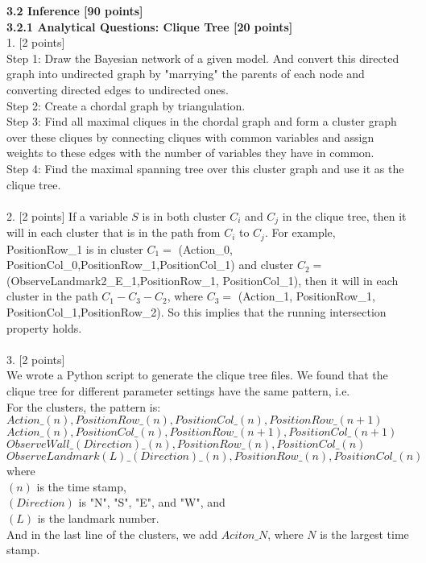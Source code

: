 \documentclass[a4paper]{article}
\begin{document}
\noindent \Large \textbf{3.2 Inference [90 points]}\\
\large \textbf{3.2.1 Analytical Questions: Clique Tree [20 points]}\\
1. [2 points]\\
Step 1: 
Draw the Bayesian network of a given model. And convert this directed graph into undirected graph by "marrying" the parents of each node and converting directed edges to undirected ones.\\
Step 2: 
Create a chordal graph by triangulation.\\
Step 3:
Find all maximal cliques in the chordal graph and form a cluster graph over these cliques by connecting cliques with common variables and assign weights  to these edges with the number of variables they have in common.\\
Step 4:
Find the maximal spanning tree over this cluster graph and use it as the clique tree.\\
\\
2. [2 points]
If a variable $S$ is in both cluster $C_i$ and $C_j$ in the clique tree, then it will in each cluster that is in the path from $C_i$ to $C_j$. For example, 
PositionRow\_1 is in cluster $C_1=$ (Action\_0, PositionCol\_0,PositionRow\_1,PositionCol\_1) and cluster $C_2=$ (ObserveLandmark2\_E\_1,PositionRow\_1, PositionCol\_1), then it will in each cluster in the path $C_1-C_3-C_2$, where $C_3=$ (Action\_1, PositionRow\_1, PositionCol\_1,PositionRow\_2). So this implies that the running intersection property holds.\\
\\
3. [2 points]
\\
We wrote a Python script to generate the clique tree files. We found that the clique tree for different parameter settings have the same pattern, i.e. \\
For the clusters, the pattern is:\\
$Action\_(n),PositionRow\_(n),PositionCol\_(n),PositionRow\_(n+1)$\\
$Action\_(n),PositionCol\_(n),PositionRow\_(n+1),PositionCol\_(n+1)$\\
$ObserveWall\_(Direction)\_(n),PositionRow\_(n),PositionCol\_(n)$\\
$ObserveLandmark(L)\_(Direction)\_(n),PositionRow\_(n),PositionCol\_(n)$\\
where\\ 
$(n)$ is the time stamp, \\
$(Direction)$ is "N", "S", "E", and "W", and \\
$(L)$ is the landmark number.\\
And in the last line of the clusters, we add $Aciton\_N$, where $N$ is the largest time stamp.\\
\end{document}
